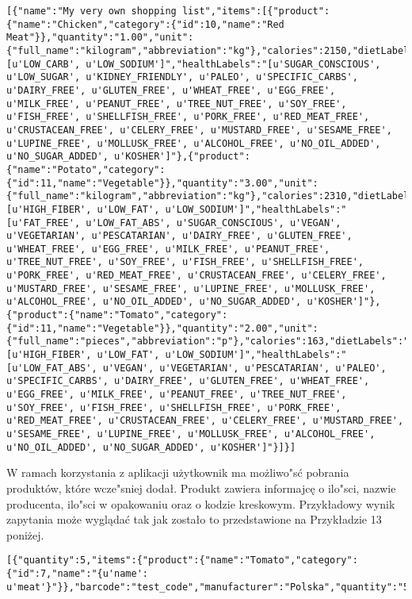 \documentclass{article}
\begin{document}
\begin{lstlisting}[label=shoppinglist_api,caption=Pobranie listy zakupowej,breaklines=true]
[{"name":"My very own shopping list","items":[{"product":{"name":"Chicken","category":{"id":10,"name":"Red Meat"}},"quantity":"1.00","unit":{"full_name":"kilogram","abbreviation":"kg"},"calories":2150,"dietLabels":"[u'LOW_CARB', u'LOW_SODIUM']","healthLabels":"[u'SUGAR_CONSCIOUS', u'LOW_SUGAR', u'KIDNEY_FRIENDLY', u'PALEO', u'SPECIFIC_CARBS', u'DAIRY_FREE', u'GLUTEN_FREE', u'WHEAT_FREE', u'EGG_FREE', u'MILK_FREE', u'PEANUT_FREE', u'TREE_NUT_FREE', u'SOY_FREE', u'FISH_FREE', u'SHELLFISH_FREE', u'PORK_FREE', u'RED_MEAT_FREE', u'CRUSTACEAN_FREE', u'CELERY_FREE', u'MUSTARD_FREE', u'SESAME_FREE', u'LUPINE_FREE', u'MOLLUSK_FREE', u'ALCOHOL_FREE', u'NO_OIL_ADDED', u'NO_SUGAR_ADDED', u'KOSHER']"},{"product":{"name":"Potato","category":{"id":11,"name":"Vegetable"}},"quantity":"3.00","unit":{"full_name":"kilogram","abbreviation":"kg"},"calories":2310,"dietLabels":"[u'HIGH_FIBER', u'LOW_FAT', u'LOW_SODIUM']","healthLabels":"[u'FAT_FREE', u'LOW_FAT_ABS', u'SUGAR_CONSCIOUS', u'VEGAN', u'VEGETARIAN', u'PESCATARIAN', u'DAIRY_FREE', u'GLUTEN_FREE', u'WHEAT_FREE', u'EGG_FREE', u'MILK_FREE', u'PEANUT_FREE', u'TREE_NUT_FREE', u'SOY_FREE', u'FISH_FREE', u'SHELLFISH_FREE', u'PORK_FREE', u'RED_MEAT_FREE', u'CRUSTACEAN_FREE', u'CELERY_FREE', u'MUSTARD_FREE', u'SESAME_FREE', u'LUPINE_FREE', u'MOLLUSK_FREE', u'ALCOHOL_FREE', u'NO_OIL_ADDED', u'NO_SUGAR_ADDED', u'KOSHER']"},{"product":{"name":"Tomato","category":{"id":11,"name":"Vegetable"}},"quantity":"2.00","unit":{"full_name":"pieces","abbreviation":"p"},"calories":163,"dietLabels":"[u'HIGH_FIBER', u'LOW_FAT', u'LOW_SODIUM']","healthLabels":"[u'LOW_FAT_ABS', u'VEGAN', u'VEGETARIAN', u'PESCATARIAN', u'PALEO', u'SPECIFIC_CARBS', u'DAIRY_FREE', u'GLUTEN_FREE', u'WHEAT_FREE', u'EGG_FREE', u'MILK_FREE', u'PEANUT_FREE', u'TREE_NUT_FREE', u'SOY_FREE', u'FISH_FREE', u'SHELLFISH_FREE', u'PORK_FREE', u'RED_MEAT_FREE', u'CRUSTACEAN_FREE', u'CELERY_FREE', u'MUSTARD_FREE', u'SESAME_FREE', u'LUPINE_FREE', u'MOLLUSK_FREE', u'ALCOHOL_FREE', u'NO_OIL_ADDED', u'NO_SUGAR_ADDED', u'KOSHER']"}]}]
\end{lstlisting}

W ramach korzystania z aplikacji użytkownik ma możliwo"sć pobrania produktów, które wcze"sniej dodał. Produkt zawiera informajcę o ilo"sci, nazwie producenta, ilo"sci w opakowaniu oraz o kodzie kreskowym. Przykładowy wynik zapytania może wyglądać tak jak zostało to przedstawione na Przykładzie 13 poniżej.

\begin{lstlisting}[label=product_api,caption=Pobranie produktów,breaklines=true]
[{"quantity":5,"items":{"product":{"name":"Tomato","category":{"id":7,"name":"{u'name': u'meat'}"}},"barcode":"test_code","manufacturer":"Polska","quantity":"5.00"}}]
\end{lstlisting}
\end{document}
